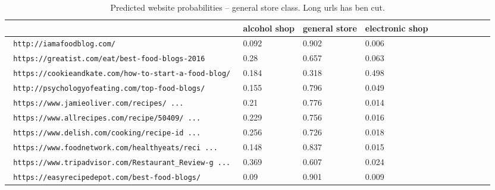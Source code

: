 \begin{table}[!hbt]
    \caption{ Predicted website probabilities -- general store class.
    Long urls has ben cut.
    \label{table:res2}
    }
\footnotesize
\begin{center}
    \begin{tabular}{|l|l|l|l|l|l|l|l|l|l|l|}
    \hline
        & alcohol shop & general store & electronic shop \\
    \hline
    \verb| http://iamafoodblog.com/ | &
0.092&0.902&0.006
\\
\verb| https://greatist.com/eat/best-food-blogs-2016 | &
0.28&0.657&0.063
\\
\verb| https://cookieandkate.com/how-to-start-a-food-blog/ | &
0.184&0.318&0.498
\\
\verb| http://psychologyofeating.com/top-food-blogs/ | &
0.155&0.796&0.049
\\
\verb| https://www.jamieoliver.com/recipes/ ... | &
0.21&0.776&0.014
\\
\verb| https://www.allrecipes.com/recipe/50409/ ... | &
0.229&0.756&0.016
\\
\verb| https://www.delish.com/cooking/recipe-id ... | &
0.256&0.726&0.018
\\
\verb| https://www.foodnetwork.com/healthyeats/reci ...| &
0.148&0.837&0.015
\\
\verb| https://www.tripadvisor.com/Restaurant_Review-g ... | &
0.369&0.607&0.024
\\
\verb| https://easyrecipedepot.com/best-food-blogs/ | &
0.09&0.901&0.009
\\

    \hline
    \end{tabular}
\end{center}
\end{table}




